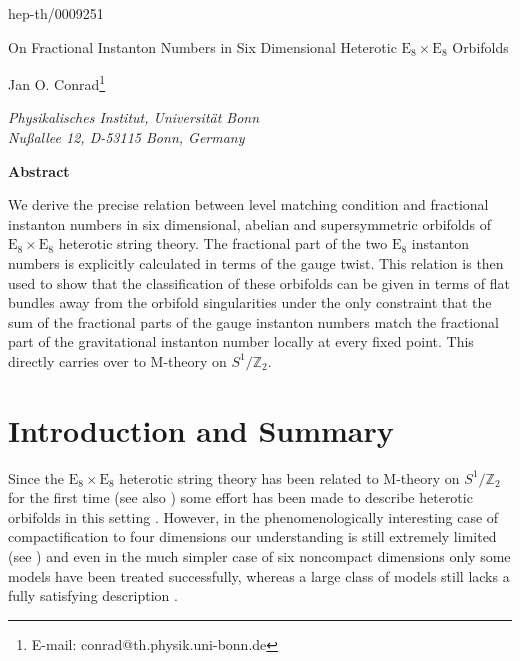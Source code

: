 \documentclass[a4paper,12pt,twoside]{article}
\numberwithin{equation}{section}
\newcommand{\pE}{\text{E}  }     %
\newcommand{\mZ}{\mathbb{Z}}
\begin{document}
\begin{titlepage}

\noindent\hfill hep-th/0009251


\vfill

\begin{center}
  \begin{center}
    \Huge On Fractional Instanton Numbers in Six Dimensional Heterotic
    $\pE_8 \times \pE_8$ Orbifolds
  \end{center}


  \vspace{1.5cm}

  Jan O. Conrad\footnote{E-mail: conrad@th.physik.uni-bonn.de}

  \smallskip

  {\it Physikalisches Institut, Universit\"at Bonn\\
    Nu\ss{}allee 12, D-53115 Bonn, Germany}
    

  \vfill

  {\bf Abstract}
  
  \bigskip

  \parbox{0.9\textwidth}{%
    We derive the precise relation between level matching condition
    and fractional instanton numbers in six dimensional, abelian and
    supersymmetric orbifolds of $\pE_8 \times \pE_8$ heterotic string
    theory. The fractional part of the two $\pE_8$ instanton numbers
    is explicitly calculated in terms of the gauge twist.  This
    relation is then used to show that the classification of these
    orbifolds can be given in terms of flat bundles away from the
    orbifold singularities under the only constraint that the sum of
    the fractional parts of the gauge instanton numbers match the
    fractional part of the gravitational instanton number locally at
    every fixed point. This directly carries over to M-theory on
    $S^1/\mZ_2$.}

\end{center}

\vfill

\end{titlepage}

\section{Introduction and Summary}


Since the $\pE_8 \times \pE_8$ heterotic string theory has been
related to M-theory on $S^1/\mZ_2$ for the first time \cite{HWI,HWII}
(see also \cite{HetTypeI}) some effort has been made to describe
heterotic orbifolds in this setting \cite{Stieberger, OvrutI,
  Kaplunovsky, OvrutII}. However, in the phenomenologically
interesting case of compactification to four dimensions our
understanding is still extremely limited (see \cite{KaplSUSY2K}) and
even in the much simpler case of six noncompact dimensions only some
models have been treated successfully, whereas a large class of models
still lacks a fully satisfying description \cite{Kaplunovsky}.
\end{document}
